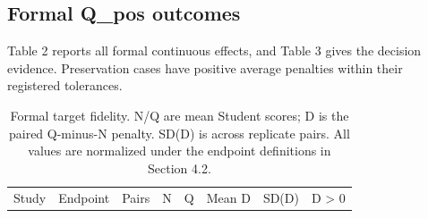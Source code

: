 \subsection{Formal Q\_pos outcomes}\label{formal-q_pos-outcomes}

Table 2 reports all formal continuous effects, and Table 3 gives the decision evidence. Preservation cases have positive average penalties within their registered tolerances.

\begin{longtable}[]{@{}
  >{\raggedright\arraybackslash}p{}
  >{\raggedright\arraybackslash}p{}
  >{\raggedleft\arraybackslash}p{}
  >{\raggedleft\arraybackslash}p{}
  >{\raggedleft\arraybackslash}p{}
  >{\raggedleft\arraybackslash}p{}
  >{\raggedleft\arraybackslash}p{}
  >{\raggedleft\arraybackslash}p{}@{}}
\caption{Formal target fidelity. N/Q are mean Student scores; D is the paired Q-minus-N penalty. SD(D) is across replicate pairs. All values are normalized under the endpoint definitions in Section 4.2.}\label{tbl:2}\tabularnewline
\toprule\noalign{}
\begin{minipage}[b]{\linewidth}\raggedright
Study
\end{minipage} & \begin{minipage}[b]{\linewidth}\raggedright
Endpoint
\end{minipage} & \begin{minipage}[b]{\linewidth}\raggedleft
Pairs
\end{minipage} & \begin{minipage}[b]{\linewidth}\raggedleft
N
\end{minipage} & \begin{minipage}[b]{\linewidth}\raggedleft
Q
\end{minipage} & \begin{minipage}[b]{\linewidth}\raggedleft
Mean D
\end{minipage} & \begin{minipage}[b]{\linewidth}\raggedleft
SD(D)
\end{minipage} & \begin{minipage}[b]{\linewidth}\raggedleft
D \textgreater{} 0
\end{minipage} \\

\end{longtable}
